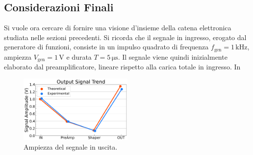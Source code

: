 \documentclass[a4paper,11pt]{article} %
\begin{document}
\subsection{Considerazioni Finali}\label{s:catena_finale}

Si vuole ora cercare di fornire una visione d'insieme della catena elettronica studiata nelle sezioni
precedenti. Si ricorda che il segnale in ingresso, erogato dal generatore di funzioni, consiste in un impulso quadrato
di frequenza $f_{\text{gen}}= 1 \,\si{\kilo\hertz}$, ampiezza $V_{\text{gen}} = 1 \,\si{\volt}$ e durata $T = 5
\,\si{\us}$. Il segnale viene quindi inizialmente elaborato dal preamplificatore, lineare rispetto alla carica
totale in ingresso. In 

\begin{figure} 
	\centering 
	\includegraphics[width=0.5\textwidth]{../Plots/Catena/trend4.png}
	\vspace{-20pt}
   \caption{\small Ampiezza del segnale in uscita.} 
   \label{i:trend} 
\end{figure}
\end{document}
